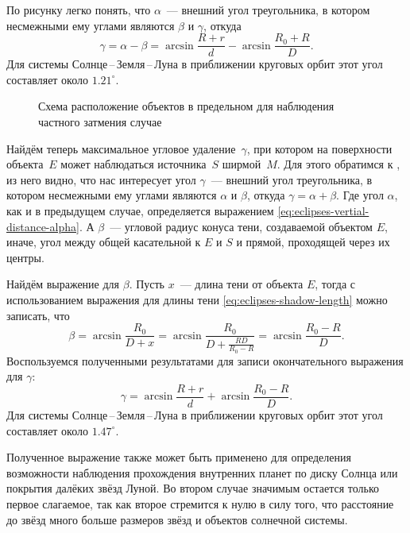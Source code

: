 По рисунку легко понять, что $\alpha$~--- внешний угол треугольника, в котором несмежными ему углами являются $\beta$ и $\gamma$, откуда
\begin{equation}
    \gamma = \alpha - \beta = \arcsin \frac{R + r}{d} - \arcsin \frac{R_0 + R}{D}.
\end{equation}
Для системы Солнце\,--\,Земля\,--\,Луна в приближении круговых орбит этот угол составляет около $1.21^\circ$.

\begin{figure}[h!]
    \centering
    
    \caption{Схема расположение объектов в предельном для наблюдения частного затмения случае}
    \label{pic:partial-eclipse-vertical-distance}
\end{figure}

Найдём теперь максимальное угловое удаление~$\gamma$, при котором на поверхности объекта~$E$ может наблюдаться  источника~$S$ ширмой~$M$. Для этого обратимся к , из него видно, что нас интересует угол $\gamma$~--- внешний угол треугольника, в котором несмежными ему углами являются $\alpha$ и $\beta$, откуда $\gamma = \alpha + \beta$. Где угол $\alpha$, как и в предыдущем случае, определяется выражением \eqref{eq:eclipses-vertial-distance-alpha}. А $\beta$~--- угловой радиус конуса тени, создаваемой объектом $E$, иначе, угол между общей касательной к $E$ и $S$ и прямой, проходящей через их центры.

Найдём выражение для $\beta$. Пусть $x$~--- длина тени от объекта $E$, тогда с использованием выражения для длины тени \eqref{eq:eclipses-shadow-length} можно записать, что 
\begin{equation*}
    \beta = \arcsin \frac{R_0}{D + x} = \arcsin \frac{R_0}{D + \frac{RD}{R_0 - R}} = \arcsin\frac{R_0 - R}{D}.
    \label{eq:shadow-radius}
\end{equation*}
Воспользуемся полученными результатами для записи окончательного выражения для $\gamma$:
\begin{equation*}
    \gamma = \arcsin \frac{R + r}{d} + \arcsin\frac{R_0 - R}{D}.
\end{equation*}
Для системы Солнце\,--\,Земля\,--\,Луна в приближении круговых орбит этот угол составляет около $1.47^\circ$. 

Полученное выражение также может быть применено для определения возможности наблюдения прохождения внутренних планет по диску Солнца или покрытия далёких звёзд Луной. Во втором случае значимым остается только первое слагаемое, так как второе стремится к нулю в силу того, что расстояние до звёзд много больше размеров звёзд и объектов солнечной системы.

